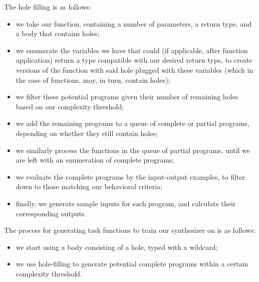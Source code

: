 \documentclass{article}
\begin{document}
The hole filling is as follows:
\begin{itemize}
    \item we take our function, containing a number of parameters, a return type, and a body that contains holes;
    \item we enumerate the variables we have that could (if applicable, after function application) return a type compatible with our desired return type, to create versions of the function with said hole plugged with these variables (which in the case of functions, may, in turn, contain holes);
    \item we filter these potential programs given their number of remaining holes based on our complexity threshold;
    \item we add the remaining programs to a queue of complete or partial programs, depending on whether they still contain holes;
    \item we similarly process the functions in the queue of partial programs, until we are left with an enumeration of complete programs;
    \item we evaluate the complete programs by the input-output examples, to filter down to those matching our behavioral criteria;
    \item finally, we generate sample inputs for each program, and calculate their corresponding outputs.
\end{itemize}

The process for generating task functions to train our synthesizer on is as follows:
\begin{itemize}
    \item we start using a body consisting of a hole, typed with a wildcard;
    \item we use hole-filling to generate potential complete programs within a certain complexity threshold.
\end{itemize}
\end{document}
